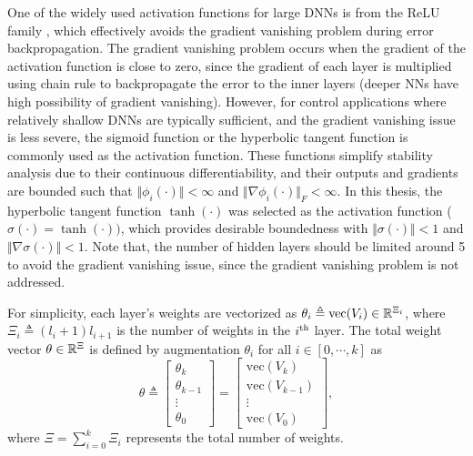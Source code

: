 One of the widely used activation functions for large DNNs is from the ReLU family \cite{RN15}, which effectively avoids the gradient vanishing problem during error backpropagation. 
The gradient vanishing problem occurs when the gradient of the activation function is close to zero, since the gradient of each layer is multiplied using chain rule to backpropagate the error to the inner layers (\ie deeper NNs have high possibility of gradient vanishing).
However, for control applications where relatively shallow DNNs are typically sufficient, and the gradient vanishing issue is less severe, the sigmoid function or the hyperbolic tangent function is commonly used as the activation function. 
These functions simplify stability analysis due to their continuous differentiability, and their outputs and gradients are bounded such that $\Vert \phi_i(\cdot)\Vert < \infty$ and $\Vert \nabla\phi_i(\cdot)\Vert_F < \infty$. 
In this thesis, the hyperbolic tangent function $\tanh(\cdot)$ was selected as the activation function (\ie $\sigma(\cdot) = \tanh(\cdot))$, which provides desirable boundedness with $\Vert\sigma(\cdot)\Vert<1$ and $\Vert\nabla\sigma(\cdot)\Vert< 1$.
Note that, the number of hidden layers should be limited around 5 to avoid the gradient vanishing issue, since the gradient vanishing problem is not addressed.

For simplicity, each layer's weights are vectorized as $\theta_i\triangleq\text{vec}(V_i)\in\mathbb{R}^{\Xi_i}$, where $\Xi_i\triangleq (l_i+1)l_{i+1}$ is the number of weights in the $i\textsuperscript{th}$ layer. 
The total weight vector $\theta\in\mathbb{R}^{\Xi}$ is defined by augmentation $\theta_i$ for all $i\in \left[0,\cdots,k\right]$ as 
\begin{equation}
    \theta \triangleq 
    \begin{bmatrix}
        \theta_k\\
        \theta_{k-1}\\
        \vdots\\
        \theta_0
    \end{bmatrix}
    =
    \begin{bmatrix}
        \text{vec}(V_k)\\
        \text{vec}(V_{k-1})\\
        \vdots\\
        \text{vec}(V_0)
    \end{bmatrix},
\end{equation}
where $\Xi={\sum_{i=0}^{k} \Xi_i}$ represents the total number of weights. 

